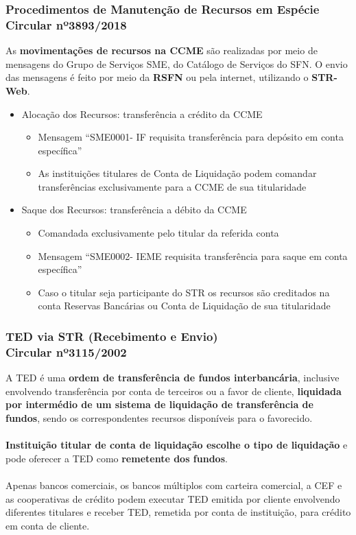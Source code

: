 \documentclass[10pt]{beamer}
\begin{document}
\begin{frame} 
\frametitle{Procedimentos de Manutenção de Recursos em Espécie\\Circular nº3893/2018}
As \textbf{movimentações de recursos na CCME} são realizadas por meio de mensagens do Grupo de Serviços SME, do Catálogo de Serviços do SFN. O envio das mensagens é feito por meio da \textbf{RSFN} ou pela internet, utilizando o \textbf{STR-Web}. 

\begin{itemize}
\item Alocação dos Recursos: transferência a crédito da CCME 
\begin{itemize}
\item Mensagem “SME0001- IF requisita transferência para depósito em conta específica” 
\item As instituições titulares de Conta de Liquidação podem comandar transferências exclusivamente para a CCME de sua titularidade
\end{itemize}
\item Saque dos Recursos: transferência a débito da CCME
\begin{itemize}
\item Comandada exclusivamente pelo titular da referida conta 
\item Mensagem “SME0002- IEME requisita transferência para saque em conta específica”
\item Caso o titular seja participante do STR os recursos são creditados na conta Reservas Bancárias ou Conta de Liquidação de sua titularidade
\end{itemize}
\end{itemize}

\end{frame}

\begin{frame} 
\frametitle{TED via STR (Recebimento e Envio)\\Circular nº3115/2002}

A TED é uma \textbf{ordem de transferência de fundos interbancária}, inclusive envolvendo transferência por conta de terceiros ou a favor de cliente, \textbf{liquidada por intermédio de um sistema de liquidação de transferência de fundos}, sendo os correspondentes recursos disponíveis para o favorecido.
\\~\\
\textbf{Instituição titular de conta de liquidação escolhe o tipo de liquidação} e pode oferecer a TED como \textbf{remetente dos fundos}.
\\~\\
Apenas bancos comerciais, os bancos múltiplos com carteira comercial, a CEF e as cooperativas de crédito podem executar TED emitida por cliente envolvendo diferentes titulares e receber TED, remetida por conta de instituição, para crédito em conta de cliente.

\end{frame}
\end{document}
